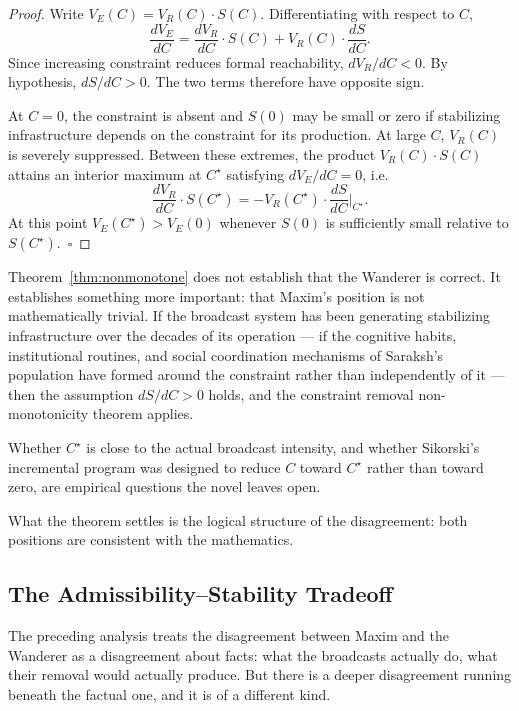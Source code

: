 \documentclass[12pt, a4paper]{article}
\theoremstyle{plain}
\theoremstyle{definition}
\theoremstyle{remark}
\begin{document}
\begin{proof}
Write $V_E(C) = V_R(C)\cdot S(C)$.
Differentiating with respect to $C$,
\[
\frac{dV_E}{dC}
= \frac{dV_R}{dC}\cdot S(C)
+ V_R(C)\cdot \frac{dS}{dC}.
\]
Since increasing constraint reduces formal
reachability, $dV_R/dC < 0$.
By hypothesis, $dS/dC > 0$.
The two terms therefore have opposite sign.

At $C = 0$, the constraint is absent and
$S(0)$ may be small or zero if stabilizing
infrastructure depends on the constraint for
its production. At large $C$, $V_R(C)$ is
severely suppressed. Between these extremes,
the product $V_R(C)\cdot S(C)$ attains an
interior maximum at $C^\star$ satisfying
$dV_E/dC = 0$, i.e.
\[
\frac{dV_R}{dC}\cdot S(C^\star)
= -V_R(C^\star)\cdot \frac{dS}{dC}\bigg|_{C^\star}.
\]
At this point $V_E(C^\star) > V_E(0)$
whenever $S(0)$ is sufficiently small relative
to $S(C^\star)$.~$\square$
\end{proof}

Theorem~\ref{thm:nonmonotone} does not establish
that the Wanderer is correct. It establishes
something more important: that Maxim's position
is not mathematically trivial. If the broadcast
system has been generating stabilizing
infrastructure over the decades of its operation
--- if the cognitive habits, institutional
routines, and social coordination mechanisms
of Saraksh's population have formed around
the constraint rather than independently of it
--- then the assumption $dS/dC > 0$ holds,
and the constraint removal non-monotonicity
theorem applies.

Whether $C^\star$ is close to the actual
broadcast intensity, and whether Sikorski's
incremental program was designed to reduce $C$
toward $C^\star$ rather than toward zero, are
empirical questions the novel leaves open.

What the theorem settles is the logical structure
of the disagreement: both positions are
consistent with the mathematics.

\subsection{The Admissibility--Stability Tradeoff}

The preceding analysis treats the disagreement
between Maxim and the Wanderer as a disagreement
about facts: what the broadcasts actually do,
what their removal would actually produce. But
there is a deeper disagreement running beneath
the factual one, and it is of a different kind.
\end{document}
